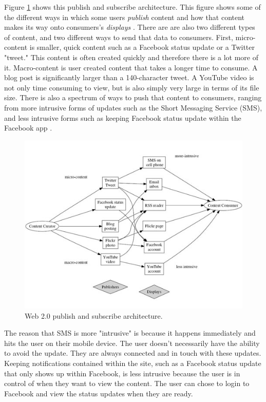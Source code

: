 \documentclass[12pt]{article}
\begin{document}
Figure \ref{fig:web2_arch} shows this publish and subscribe architecture.  This figure shows some of the different ways in which some users \textit{publish}  content and how that content makes its way onto consumers's \textit{displays} \cite{FM2125}.  There are are also two different types of content, and two different ways to send that data to consumers.  First, micro-content is smaller, quick content such as a Facebook status update or a Twitter "tweet."  This content is often created quickly and therefore there is a lot more of it.  Macro-content is user created content that takes a longer time to consume.  A blog post is significantly larger than a 140-character tweet. A YouTube video is not only time consuming to view, but is also simply very large in terms of its file size.  There is also a spectrum of ways to push that content to consumers, ranging from more intrusive forms of updates such as the Short Messaging Service (SMS), and less intrusive forms such as keeping Facebook status update within the Facebook app \cite{FM2125}.

\begin{figure}[H]
  \begin{center}
    \includegraphics[scale=0.8]{web2_arch.jpg}
    \caption{Web 2.0 publish and subscribe architecture.}
    \label{fig:web2_arch}
  \end{center}
\end{figure}

The reason that SMS is more "intrusive" is because it happens immediately and hits the user on their mobile device.  The user doesn't necessarily have the ability to avoid the update.  They are always connected and in touch with these updates.  Keeping notifications contained within the site, such as a Facebook status update that only shows up within Facebook, is less intrusive because the user is in control of when they want to view the content.  The user can chose to login to Facebook and view the status updates when they are ready.
\end{document}
